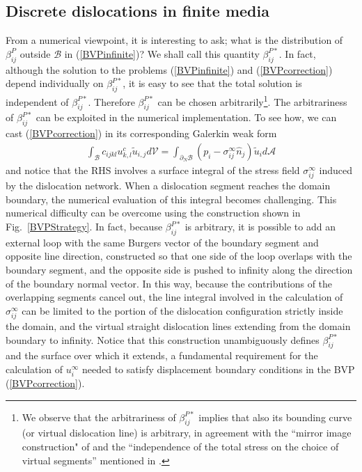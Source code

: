 





\subsection{Discrete dislocations in finite media}

From a numerical viewpoint, it is interesting to ask; what is the distribution of $\beta^P_{ij}$ outside $\mathcal{B}$ in (\ref{BVPinfinite})? We shall call this quantity $\beta^{P*}_{ij}$. In fact, although the solution to the problems (\ref{BVPinfinite}) and (\ref{BVPcorrection}) depend individually on $\beta^{P*}_{ij}$, it is easy to see that the total solution is independent of  $\beta^{P*}_{ij}$. Therefore $\beta^{P*}_{ij}$ can be chosen arbitrarily\footnote{We observe that the arbitrariness of $\beta^{P*}_{ij}$ implies that also its bounding curve (or virtual dislocation line) is arbitrary, in agreement with the ``mirror image construction" of \cite{Weygand:2002tq}  and the ``independence of the total stress on the choice of virtual segments'' mentioned in \cite{Weinberger:2009fk}.}.  The arbitrariness of $\beta^{P*}_{ij}$ can be exploited in the numerical implementation. To see how, we can cast  (\ref{BVPcorrection}) in its   corresponding Galerkin weak form
\begin{align}
\int_\mathcal{B}c_{ijkl}u^c_{k,l}\tilde{u}_{i,j}d\mathcal{V}=\int_{\partial_N\mathcal{B}}\left(p_i- \sigma^\infty_{ij}\hat{n}_j\right)\tilde{u}_id\mathcal{A}
\label{BVPcorrectionWeak}
\end{align} 
and notice that the RHS involves a surface integral  of the stress field  $\sigma^\infty_{ij}$ induced by the dislocation network. When a dislocation segment reaches the domain boundary, the numerical evaluation of this integral becomes challenging. This numerical difficulty can be  overcome using the construction shown in Fig.~\ref{BVPStrategy}. In fact, because $\beta^{P*}_{ij}$ is arbitrary, it is possible to add an external loop with the same Burgers vector of the boundary segment and opposite line direction, constructed so that one side of the loop overlaps with the boundary segment, and the opposite side is pushed to infinity along the direction of the boundary normal vector. In this way, because the contributions of the overlapping segments cancel out, the line integral involved in the calculation of $\sigma^{\infty}_{ij}$ can be limited to the portion of the dislocation configuration strictly inside the domain, and the virtual straight dislocation lines extending from the domain boundary to infinity. Notice that this construction unambiguously defines $\beta^{P*}_{ij}$ and the surface over which it extends, a fundamental requirement for the calculation of $u^\infty_i$ needed to satisfy displacement boundary conditions in the BVP (\ref{BVPcorrection}). 

